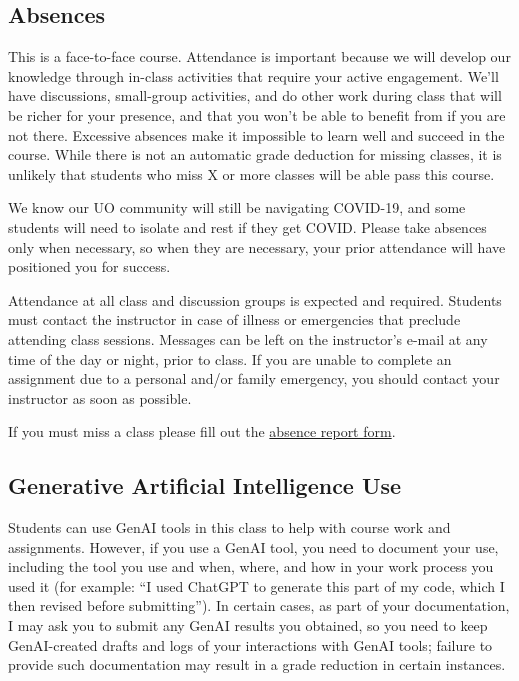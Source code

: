 \documentclass[
  letterpaper,
  DIV=11,
  numbers=noendperiod]{scrartcl}
\begin{document}
\hypertarget{absences}{%
\subsection{Absences}\label{absences}}

This is a face-to-face course. Attendance is important because we will
develop our knowledge through in-class activities that require your
active engagement. We'll have discussions, small-group activities, and
do other work during class that will be richer for your presence, and
that you won't be able to benefit from if you are not there. Excessive
absences make it impossible to learn well and succeed in the course.
While there is not an automatic grade deduction for missing classes, it
is unlikely that students who miss X or more classes will be able pass
this course.

We know our UO community will still be navigating COVID-19, and some
students will need to isolate and rest if they get COVID. Please take
absences only when necessary, so when they are necessary, your prior
attendance will have positioned you for success.

Attendance at all class and discussion groups is expected and required.
Students must contact the instructor in case of illness or emergencies
that preclude attending class sessions. Messages can be left on the
instructor's e-mail at any time of the day or night, prior to class. If
you are unable to complete an assignment due to a personal and/or family
emergency, you should contact your instructor as soon as possible.

If you must miss a class please fill out the
\href{https://lor.instructure.com/resources/30f8469edcc045b3aaf1e6a535301b9b?shared}{absence
report form}.

\hypertarget{generative-artificial-intelligence-use}{%
\subsection{Generative Artificial Intelligence
Use}\label{generative-artificial-intelligence-use}}

Students can use GenAI tools in this class to help with course work and
assignments. However, if you use a GenAI tool, you need to document your
use, including the tool you use and when, where, and how in your work
process you used it (for example: ``I used ChatGPT to generate this part
of my code, which I then revised before submitting''). In certain cases,
as part of your documentation, I may ask you to submit any GenAI results
you obtained, so you need to keep GenAI-created drafts and logs of your
interactions with GenAI tools; failure to provide such documentation may
result in a grade reduction in certain instances.
\end{document}
